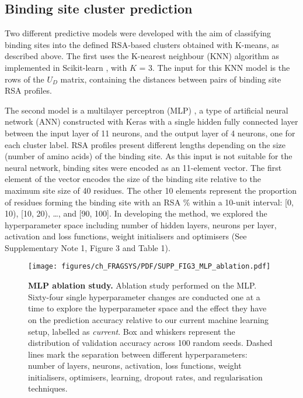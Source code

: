 \subsection{Binding site cluster prediction}

Two different predictive models were developed with the aim of classifying binding sites into the defined RSA-based clusters obtained with K-means, as described above. The first  uses the K-nearest neighbour (KNN) algorithm as implemented in Scikit-learn \cite{PEDREGOSA_2011_SKLEARN}, with $K$ = 3. The input for this KNN model is the rows of the $U_{D}$ matrix, containing the distances between pairs of binding site RSA profiles.

The second model is a multilayer perceptron (MLP) \cite{CYBENKO_1989_MLP}, a type of artificial neural network (ANN) constructed with Keras \cite{CHOLLET_2015_KERAS} with a single hidden fully connected layer between the input layer of 11 neurons, and the output layer of 4 neurons, one for each cluster label. RSA profiles present different lengths depending on the size (number of amino acids) of the binding site. As this input is not suitable for the neural network, binding sites were encoded as an 11-element vector. The first element of the vector encodes the size of the binding site relative to the maximum site size of 40 residues. The other 10 elements represent the proportion of residues forming the binding site with an RSA \% within a 10-unit interval: [0, 10), [10, 20), …, and [90, 100]. In developing the method, we explored the hyperparameter space including number of hidden layers, neurons per layer, activation and loss functions, weight initialisers and optimisers (See Supplementary Note 1, Figure 3 and Table 1).

\begin{figure}[htbp]
    \centering
    \texttt{[image: figures/ch\_FRAGSYS/PDF/SUPP\_FIG3\_MLP\_ablation.pdf]}
    \caption[MLP ablation study]{\textbf{MLP ablation study.} Ablation study performed on the MLP. Sixty-four single hyperparameter changes are conducted one at a time to explore the hyperparameter space and the effect they have on the prediction accuracy relative to our current machine learning setup, labelled as \textit{current}. Box and whiskers represent the distribution of validation accuracy across 100 random seeds. Dashed lines mark the separation between different hyperparameters: number of layers, neurons, activation, loss functions, weight initialisers, optimisers, learning, dropout rates, and regularisation techniques.}
    \label{fig:mlp_ablation}
\end{figure}

